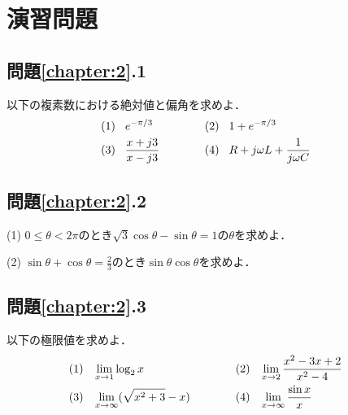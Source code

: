 \newpage

\section*{演習問題}

\subsection*{問題\ref{chapter:2}.1}

以下の複素数における絶対値と偏角を求めよ．
\begin{align}
(1) \hspace{3mm} & e^{-\pi/3} \nonumber & \qquad & &
(2) \hspace{3mm} &1+e^{-\pi/3} & \nonumber \\
(3) \hspace{3mm} & \displaystyle \frac{x+j3}{x-j3} \nonumber & \qquad & &
(4) \hspace{3mm} & \displaystyle R+j\omega L + \frac{1}{j\omega C} & \nonumber
\end{align}

\subsection*{問題\ref{chapter:2}.2}

(1) $0\leq \theta < 2\pi$のとき$\sqrt{3}\cos \theta -\sin \theta = 1$の$\theta$を求めよ．

(2) $\sin \theta + \cos \theta = \displaystyle \frac{2}{3}$のとき$\sin \theta \cos \theta$を求めよ．

\subsection*{問題\ref{chapter:2}.3}

以下の極限値を求めよ．
\begin{align}
(1) \hspace{3mm} & \lim_{x \rightarrow 1} \log_2 x \nonumber & \qquad & &
(2) \hspace{3mm} & \lim_{x \rightarrow 2} \displaystyle \frac{x^2-3x+2}{x^2-4} & \nonumber \\
(3) \hspace{3mm} & \lim_{x \rightarrow \infty } \displaystyle (\sqrt{x^2+3}-x) \nonumber & \qquad & &
(4) \hspace{3mm} & \displaystyle \lim_{x \rightarrow \infty} \displaystyle \frac{\sin x}{x} & \nonumber
\end{align}

